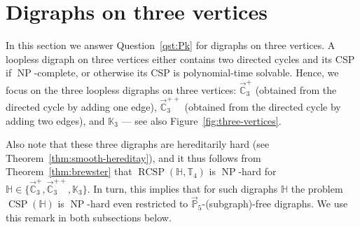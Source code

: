 \documentclass{article}
\theoremstyle{definition}
\theoremstyle{remark}
\DeclareMathOperator{\NP}{NP}
\DeclareMathOperator{\CSP}{CSP}
\DeclareMathOperator{\RCSP}{RCSP}
\newcommand{\bC}{{\mathbb C}}
\newcommand{\bH}{{\mathbb H}}
\newcommand{\bK}{{\mathbb K}}
\newcommand{\bP}{{\mathbb P}}
\newcommand{\bT}{{\mathbb T}}
\begin{document}
\section{Digraphs on three vertices}
\label{sect:3-vertices}

In this section we answer Question~\ref{qst:Pk} for digraphs on three vertices.
A loopless digraph on three vertices either contains two directed cycles and its CSP if $\NP$-complete,
or otherwise its CSP is polynomial-time solvable. Hence, we focus on the three loopless digraphs
on three vertices: $\vec{\bC}_3^+$ (obtained from the directed cycle by adding one edge),
$\vec{\bC}_3^{++}$ (obtained from the directed cycle by adding two edges), and $\bK_3$ --- see
also Figure~\ref{fig:three-vertices}.

Also note that these three digraphs are hereditarily hard (see Theorem~\ref{thm:smooth-hereditay}), 
and it thus follows from Theorem~\ref{thm:brewster} that $\RCSP(\bH,\bT_4)$ is $\NP$-hard
for $\bH\in\{\vec{\bC}_3^+, \vec{\bC}_3^{++}, \bK_3\}$.
In turn, this implies that for such digraphs $\bH$ the problem $\CSP(\bH)$ is $\NP$-hard even
restricted to $\vec{\bP}_5$-(subgraph)-free digraphs. We use this remark in both subsections below.
\end{document}

